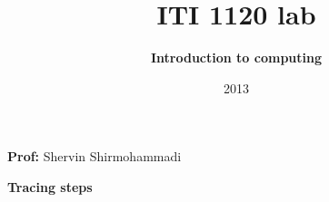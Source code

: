 \documentclass[]{article}
\begin{document}
	\title{ITI 1120 lab}
	\author{{\bf Introduction to computing}}
	\date{2013}
	\maketitle

	\begin{center}
		{\bf Prof:} Shervin Shirmohammadi
	\end{center}
	\pagebreak
	\large{\bf Tracing steps}\\\\
	\noindent
	\normalsize
	\begin{enumerate}
		
	\end{enumerate}
	
\end{document}
